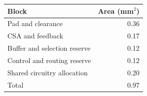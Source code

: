 \begin{tabular}{lr}
\toprule
Block & Area (mm$^2$) \\
\midrule
Pad and clearance & 0.36 \\
CSA and feedback & 0.17 \\
Buffer and selection reserve & 0.12 \\
Control and routing reserve & 0.12 \\
Shared circuitry allocation & 0.20 \\
\midrule
Total & 0.97 \\
\bottomrule
\end{tabular}
